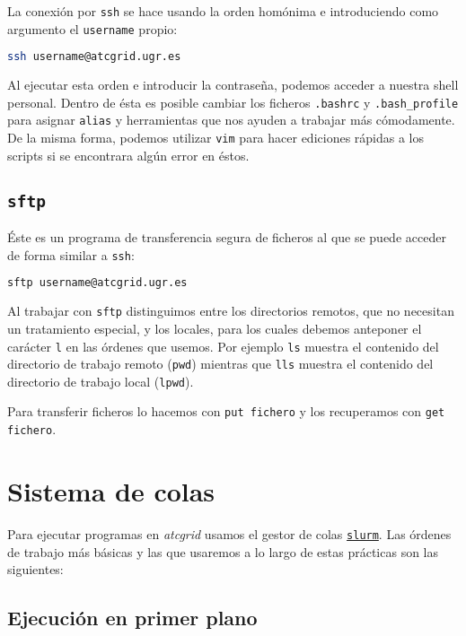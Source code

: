 La conexión por \texttt{ssh} se hace usando la orden homónima e introduciendo como argumento el \texttt{username} propio:

\begin{lstlisting}[language=sh]
ssh username@atcgrid.ugr.es
\end{lstlisting}

Al ejecutar esta orden e introducir la contraseña, podemos acceder a nuestra shell personal.
Dentro de ésta es posible cambiar los ficheros \texttt{.bashrc} y \texttt{.bash\_profile} para asignar \texttt{alias} y herramientas que nos ayuden a trabajar más cómodamente.
De la misma forma, podemos utilizar \texttt{vim} para hacer ediciones rápidas a los scripts si se encontrara algún error en éstos.

\subsection{\texttt{sftp}}

Éste es un programa de transferencia segura de ficheros al que se puede acceder de forma similar a \texttt{ssh}:

\begin{lstlisting}[language=sh]
sftp username@atcgrid.ugr.es
\end{lstlisting}

Al trabajar con \texttt{sftp} distinguimos entre los directorios remotos, que no necesitan un tratamiento especial, y los locales, para los cuales debemos anteponer el carácter \texttt{l} en las órdenes que usemos.
Por ejemplo \texttt{ls} muestra el contenido del directorio de trabajo remoto (\texttt{pwd}) mientras que \texttt{lls} muestra el contenido del directorio de trabajo local (\texttt{lpwd}).

Para transferir ficheros lo hacemos con \texttt{put fichero} y los recuperamos con \texttt{get fichero}.

\section{Sistema de colas}

Para ejecutar programas en \textit{atcgrid} usamos el gestor de colas \href{https://slurm.schedmd.com/pdfs/summary.pdf}{\texttt{slurm}}.
Las órdenes de trabajo más básicas y las que usaremos a lo largo de estas prácticas son las siguientes:

\subsection{Ejecución en primer plano}

